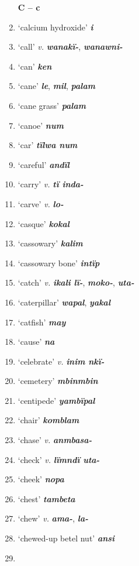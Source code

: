 \begin{enumerate}[noitemsep, label={}, align=left, widest=190, labelsep=1ex,leftmargin=*,itemindent=-10pt]
\noindent \textbf{C – c}\\ \item

‘calcium hydroxide’ \textbf{\textit{i}} \item
‘call’ \textit{v.} \textbf{\textit{wanakï-}}, \textbf{\textit{wanawni-}} \item
‘can’ \textbf{\textit{ken}} \item
‘cane’ \textbf{\textit{le}}, \textbf{\textit{mil}}, \textbf{\textit{palam}} \item
‘cane grass’ \textbf{\textit{palam}} \item
‘canoe’ \textbf{\textit{num}} \item
‘car’ \textbf{\textit{tïlwa num}} \item
‘careful’ \textbf{\textit{andïl}} \item
‘carry’ \textit{v.} \textbf{\textit{tï inda-}} \item
‘carve’ \textit{v.} \textbf{\textit{lo-}} \item
‘casque’ \textbf{\textit{kokal}} \item
‘cassowary’ \textbf{\textit{kalim}} \item
‘cassowary bone’ \textbf{\textit{intïp}} \item
‘catch’ \textit{v.} \textbf{\textit{ikali lï-}}, \textbf{\textit{moko-}}, \textbf{\textit{uta-}} \item
‘caterpillar’ \textbf{\textit{wapal}}, \textbf{\textit{yakal}} \item
‘catfish’ \textbf{\textit{may}} \item
‘cause’ \textbf{\textit{na}} \item
‘celebrate’ \textit{v.} \textbf{\textit{inim nkï-}} \item
‘cemetery’ \textbf{\textit{mbinmbin}} \item
‘centipede’ \textbf{\textit{yambïpal}} \item
‘chair’ \textbf{\textit{komblam}} \item
‘chase’ \textit{v.} \textbf{\textit{anmbasa-}} \item
‘check’ \textit{v.} \textbf{\textit{lïmndï uta-}} \item
‘cheek’ \textbf{\textit{nopa}} \item
‘chest’ \textbf{\textit{tambeta}} \item
‘chew’ \textit{v.} \textbf{\textit{ama-}}, \textbf{\textit{la-}} \item
‘chewed-up betel nut’ \textbf{\textit{ansi}} \item

\end{enumerate}
